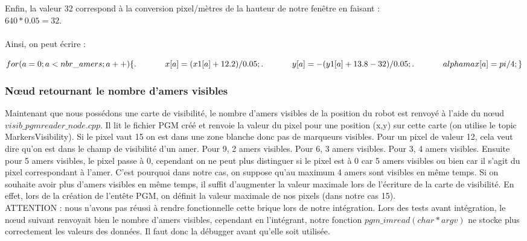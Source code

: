 \documentclass[10pt,a4paper]{article}
\begin{document}
Enfin, la valeur 32 correspond à la conversion pixel/mètres de la hauteur de notre fenêtre en faisant :\\ $640*0.05=32$.\\
\\
Ainsi, on peut écrire :

$\\
for(a=0;a<nbr\_amers;a++) ~\\
	\{  ~\\
. \hspace{35pt}    x[a]=(x1[a]+12.2)/0.05; ~\\
. \hspace{35pt}    y[a]=-(y1[a]+13.8-32)/0.05; ~\\
. \hspace{35pt}    alphamax[a]=pi/4; ~\\
	\} ~\\
	$

\subsubsection{Nœud retournant le nombre d'amers visibles}
Maintenant que nous possédons une carte de visibilité, le nombre d'amers visibles de la position du robot est renvoyé à l'aide du nœud $visib\_pgmreader\_node.cpp$. Il lit le fichier PGM créé et renvoie la valeur du pixel pour une position (x,y) sur cette carte (on utilise le topic MarkersVisibility). Si le pixel vaut 15 on est dans une zone blanche donc pas de marqueurs visibles. Pour un pixel de valeur 12, cela veut dire qu'on est dans le champ de visibilité d'un amer. Pour 9, 2 amers visibles. Pour 6, 3 amers visibles. Pour 3, 4 amers visibles. Ensuite pour 5 amers visibles, le pixel passe à 0, cependant on ne peut plus distinguer si le pixel est à 0 car 5 amers visibles ou bien car il s'agit du pixel correspondant à l'amer. C'est pourquoi dans notre cas, on suppose qu'au maximum 4 amers sont visibles en même temps. 
Si on souhaite avoir plus d'amers visibles en même temps, il suffit d'augmenter la valeur maximale lors de l’écriture de la carte de visibilité. En effet, lors de la création de l’entête PGM, on définit la valeur maximale de nos pixels (dans notre cas 15).\\

ATTENTION : nous n'avons pas réussi à rendre fonctionnelle cette brique lors de notre intégration. Lors des tests avant intégration, le nœud suivant renvoyait bien le nombre d'amers visibles, cependant en l'intégrant, notre fonction $pgm\_imread(char *argv)$ ne stocke plus correctement les valeurs des données. Il faut donc la débugger avant qu'elle soit utilisée.
\end{document}
